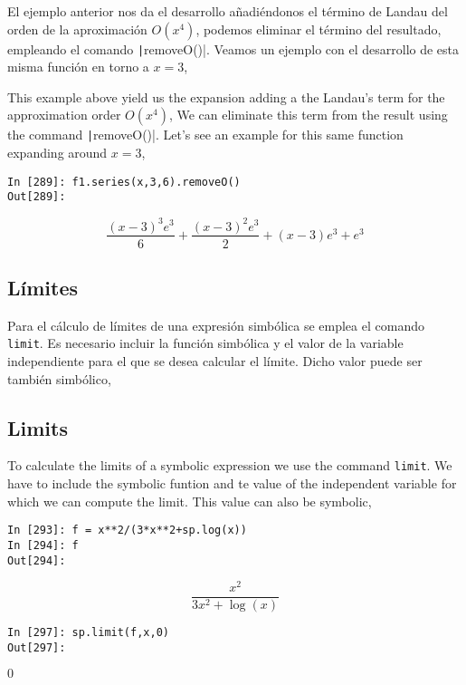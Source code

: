 \begin{paracol}{2}
El ejemplo anterior nos da el desarrollo añadiéndonos el término de Landau del orden de la aproximación $O(x^4)$, podemos eliminar el término del resultado, empleando el comando \texttt|removeO()|. Veamos un ejemplo con el desarrollo de esta misma función en torno a $x=3$,

\switchcolumn
This example above yield us the expansion adding a the Landau's term for the approximation order $O(x^4)$, We can eliminate this term from the result using the command \texttt|removeO()|. Let's see an example for this same function expanding around $x=3$,
\end{paracol}
 
 
\begin{center}
	\begin{minipage}{.3\textwidth}
		\begin{verbatim}
In [289]: f1.series(x,3,6).removeO()
Out[289]: 
		\end{verbatim}
		\begin{equation*}			
			\frac{(x-3)^3e^3}{6}+\frac{(x-3)^2e^3}{2}+(x-3)e^3+e^3
		\end{equation*}
	\end{minipage}
\end{center}

\begin{paracol}{2}
\subsection{Límites} 
Para el cálculo de límites de una expresión simbólica se emplea el comando \texttt{limit}. Es necesario incluir la función simbólica y el valor de la variable independiente para el que se desea calcular el límite.  Dicho valor puede ser también simbólico,
\switchcolumn
\subsection{Limits} 
To calculate the limits of a symbolic expression we use the command \texttt{limit}. We have to include the symbolic funtion and te value of the independent variable for which we can compute the limit. This value can also be symbolic,
\end{paracol}

\begin{center}
	\begin{minipage}{.3\textwidth}
		\begin{verbatim}
In [293]: f = x**2/(3*x**2+sp.log(x))
In [294]: f
Out[294]:	
		\end{verbatim}
\begin{equation*}
\frac{x^2}{3x^2+\log(x)}	
\end{equation*}

\begin{verbatim}
In [297]: sp.limit(f,x,0)
Out[297]: 
		\end{verbatim}
		$0$
	\end{minipage}
\end{center}

